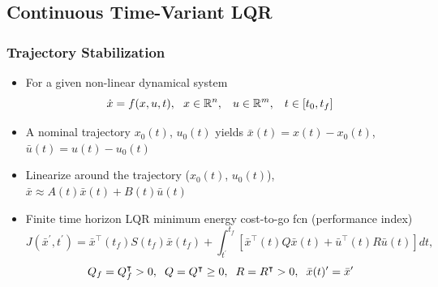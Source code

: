 \documentclass{beamer}
\begin{document}

\subsection{Continuous Time-Variant LQR}

\begin{frame}
\frametitle{Trajectory Stabilization}
\begin{itemize}
\item For a given non-linear dynamical system
\begin{equation*}
\dot{x} = f(x,u,t), \hspace{.23cm} x\in \mathbb{R}^n, \hspace{.3cm} u\in \mathbb{R}^m, \hspace{.3cm} t \in [t_0, t_f]
\end{equation*} 
\item A nominal trajectory $x_0(t)$, $u_0(t)$ yields $\bar{x}(t)=x(t)-x_0(t)$, $\bar{u}(t)=u(t)-u_0(t)$
\item Linearize around the trajectory ($x_0(t)$, $u_0(t)$), $\bar{x}\approx A(t)\bar{x}(t)+B(t)\bar{u}(t)$ 
\item Finite time horizon LQR minimum energy cost-to-go fcn (performance index)
\begin{equation*}
J({\bar{x}^{\prime}, t^{\prime}})= \bar{x}^{\intercal}(t_f)S(t_f)\bar{x}(t_f)+  \int_{t^{\prime}}^{t_f} [ \bar{x}^{\intercal}(t)Q\bar{x}(t)+\bar{u}^{\intercal}(t)R\bar{u}(t)]dt,
\end{equation*}
\begin{equation*}
Q_f=Q_f^{\intercal}> 0, \hspace{.2cm} Q=Q^{\intercal}\geq 0, \hspace{.2cm} R=R^{\intercal}> 0, \hspace{.2cm} \bar{x}(t)^{\prime}=\bar{x}^{\prime}
\end{equation*}
\end{itemize}
\end{frame}

\end{document}
